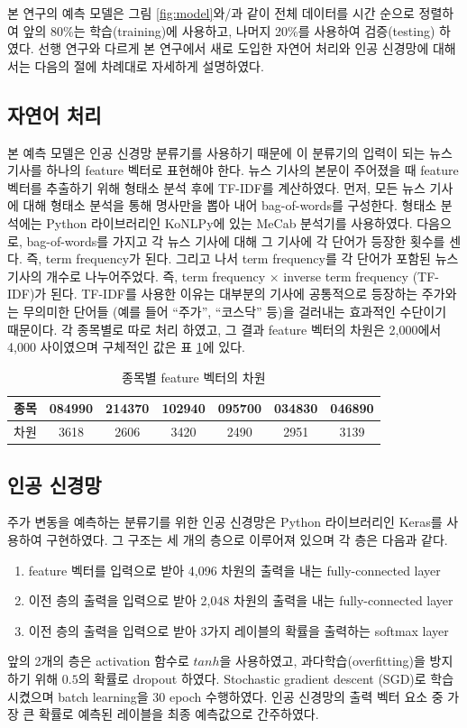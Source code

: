 \documentclass[a4paper,10pt]{article}
\begin{document}
본 연구의 예측 모델은 그림 \ref{fig:model}와/과 같이 전체 데이터를 시간 순으로 정렬하여
앞의 80\%는 학습(training)에 사용하고, 나머지 20\%를 사용하여 검증(testing) 하였다.
선행 연구와 다르게 본 연구에서 새로 도입한 자연어 처리와 인공 신경망에 대해서는 다음의 절에 차례대로 자세하게 설명하였다.

\subsection{자연어 처리}

본 예측 모델은 인공 신경망 분류기를 사용하기 때문에 이 분류기의 입력이 되는 뉴스 기사를 하나의 feature 벡터로 표현해야 한다.
뉴스 기사의 본문이 주어졌을 때 feature 벡터를 추출하기 위해 형태소 분석 후에 TF-IDF를 계산하였다.
먼저, 모든 뉴스 기사에 대해 형태소 분석을 통해 명사만을 뽑아 내어 bag-of-words를 구성한다.
형태소 분석에는 Python 라이브러리인 KoNLPy에 있는 MeCab 분석기를 사용하였다.
다음으로, bag-of-words를 가지고 각 뉴스 기사에 대해 그 기사에 각 단어가 등장한 횟수를 센다.
즉, term frequency가 된다.
그리고 나서 term frequency를 각 단어가 포함된 뉴스 기사의 개수로 나누어주었다.
즉, term frequency $\times$ inverse term frequency (TF-IDF)가 된다.
TF-IDF를 사용한 이유는 대부분의 기사에 공통적으로 등장하는 주가와는 무의미한 단어들
(예를 들어 ``주가'', ``코스닥'' 등)을 걸러내는 효과적인 수단이기 때문이다.
각 종목별로 따로 처리 하였고, 그 결과 feature 벡터의 차원은 2,000에서 4,000 사이였으며 구체적인 값은 표 \ref{tbl:dimension}에 있다.
\begin{table}[h]
\begin{tabular}{|c||c|c|c|c|c|c|}
\hline
종목 & 084990 & 214370 & 102940 & 095700 & 034830 & 046890 \\
\hline
차원 & 3618 & 2606 & 3420 & 2490 & 2951 & 3139 \\
\hline
\end{tabular}
\centering
\caption{종목별 feature 벡터의 차원}
\label{tbl:dimension}
\end{table}

\subsection{인공 신경망}

주가 변동을 예측하는 분류기를 위한 인공 신경망은 Python 라이브러리인 Keras를 사용하여 구현하였다.
그 구조는 세 개의 층으로 이루어져 있으며 각 층은 다음과 같다.
\begin{enumerate}
\item feature 벡터를 입력으로 받아 4,096 차원의 출력을 내는 fully-connected layer
\item 이전 층의 출력을 입력으로 받아 2,048 차원의 출력을 내는 fully-connected layer
\item 이전 층의 출력을 입력으로 받아 3가지 레이블의 확률을 출력하는 softmax layer
\end{enumerate}
앞의 2개의 층은 activation 함수로 $tanh$을 사용하였고, 과다학습(overfitting)을 방지하기 위해 $0.5$의 확률로 dropout 하였다.
Stochastic gradient descent (SGD)로 학습시켰으며 batch learning을 30 epoch 수행하였다.
인공 신경망의 출력 벡터 요소 중 가장 큰 확률로 예측된 레이블을 최종 예측값으로 간주하였다.
\end{document}
